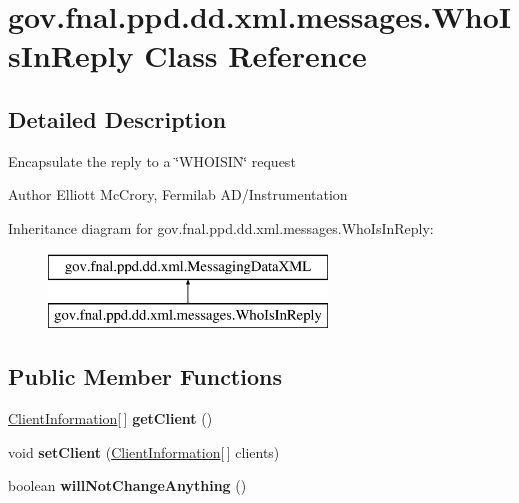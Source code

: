 \hypertarget{classgov_1_1fnal_1_1ppd_1_1dd_1_1xml_1_1messages_1_1WhoIsInReply}{\section{gov.\-fnal.\-ppd.\-dd.\-xml.\-messages.\-Who\-Is\-In\-Reply Class Reference}
\label{classgov_1_1fnal_1_1ppd_1_1dd_1_1xml_1_1messages_1_1WhoIsInReply}
}


\subsection{Detailed Description}
Encapsulate the reply to a \char`\"{}\-W\-H\-O\-I\-S\-I\-N\char`\"{} request

\begin{DoxyAuthor}{Author}
Elliott Mc\-Crory, Fermilab A\-D/\-Instrumentation 
\end{DoxyAuthor}
Inheritance diagram for gov.\-fnal.\-ppd.\-dd.\-xml.\-messages.\-Who\-Is\-In\-Reply\-:\begin{figure}[H]
\begin{center}
\leavevmode
\includegraphics[height=2.000000cm]{classgov_1_1fnal_1_1ppd_1_1dd_1_1xml_1_1messages_1_1WhoIsInReply}
\end{center}
\end{figure}
\subsection*{Public Member Functions}
\begin{DoxyCompactItemize}
\item 
\hypertarget{classgov_1_1fnal_1_1ppd_1_1dd_1_1xml_1_1messages_1_1WhoIsInReply_a15b5225293c790047d9927cdc25bd8b2}{\hyperlink{classgov_1_1fnal_1_1ppd_1_1dd_1_1xml_1_1ClientInformation}{Client\-Information}\mbox{[}$\,$\mbox{]} {\bfseries get\-Client} ()}\label{classgov_1_1fnal_1_1ppd_1_1dd_1_1xml_1_1messages_1_1WhoIsInReply_a15b5225293c790047d9927cdc25bd8b2}

\item 
\hypertarget{classgov_1_1fnal_1_1ppd_1_1dd_1_1xml_1_1messages_1_1WhoIsInReply_a20ffd58b7a96884c4ea7987be4d6cdc3}{void {\bfseries set\-Client} (\hyperlink{classgov_1_1fnal_1_1ppd_1_1dd_1_1xml_1_1ClientInformation}{Client\-Information}\mbox{[}$\,$\mbox{]} clients)}\label{classgov_1_1fnal_1_1ppd_1_1dd_1_1xml_1_1messages_1_1WhoIsInReply_a20ffd58b7a96884c4ea7987be4d6cdc3}

\item 
\hypertarget{classgov_1_1fnal_1_1ppd_1_1dd_1_1xml_1_1messages_1_1WhoIsInReply_a335779f93e5c08584605cb8c7ab0108e}{boolean {\bfseries will\-Not\-Change\-Anything} ()}\label{classgov_1_1fnal_1_1ppd_1_1dd_1_1xml_1_1messages_1_1WhoIsInReply_a335779f93e5c08584605cb8c7ab0108e}

\end{DoxyCompactItemize}


